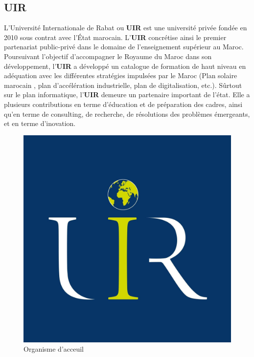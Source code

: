 \documentclass[a4paper]{report}
\begin{document}
\begin{doublespace}
    \subsection{UIR}
    L’Université Internationale de Rabat ou \textbf{UIR} est une université privée fondée en 2010 sous contrat avec l’État marocain.
    L'\textbf{UIR} concrétise ainsi le premier partenariat public-privé dans le domaine de l'enseignement supérieur au Maroc.
    Poursuivant l'objectif d'accompagner le Royaume du Maroc dans son développement, l'\textbf{UIR} a développé un catalogue
    de formation de haut niveau en adéquation avec les différentes stratégies impulsées par le Maroc (Plan solaire marocain
    , plan d'accélération industrielle, plan de digitalisation, etc.). Sûrtout sur le plan informatique, l'\textbf{UIR} demeure
    un partenaire important de l'état. Elle a plusieurs contributions en terme d'éducation et de préparation des cadres, ainsi
    qu'en terme de consulting, de recherche, de résolutions des problèmes émergeants, et en terme d'inovation.
    \begin{figure}[H]
        \begin{center}
            \includegraphics[scale=0.1]{images/logo-uir.jpg}
            \caption{Organisme d'acceuil}
        \end{center}
    \end{figure}

\end{doublespace}
\end{document}
